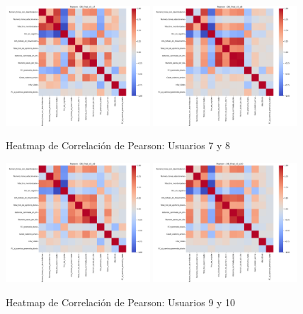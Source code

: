 \documentclass[12pt,letterpaper,twoside]{report}
\begin{document}
\begin{figure}[H]
\centering
\includegraphics[width=0.48\textwidth]{figuras/DB_final_v3_u7_heatmap_pearson.png}
\includegraphics[width=0.48\textwidth]{figuras/DB_final_v3_u8_heatmap_pearson.png}
\caption{Heatmap de Correlación de Pearson: Usuarios 7 y 8}
\end{figure}

\begin{figure}[H]
\centering
\includegraphics[width=0.48\textwidth]{figuras/DB_final_v3_u9_heatmap_pearson.png}
\includegraphics[width=0.48\textwidth]{figuras/DB_final_v3_u10_heatmap_pearson.png}
\caption{Heatmap de Correlación de Pearson: Usuarios 9 y 10}
\end{figure}
\end{document}
